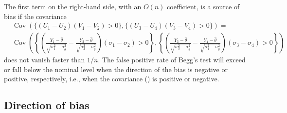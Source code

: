 \documentclass[12pt]{article}
\renewcommand{\P}{P}
\newcommand{\y}{Y}
\renewcommand{\u}{U}
\renewcommand{\v}{V}
\newcommand{\thetahat}{\hat{\theta}}
\newcommand{\h}[2]{\{(\u_{#1}-\u_{#2})(\v_{#1}-\v_{#2})>0\}}
\DeclareMathOperator{\Cov}{Cov}
\begin{document}
    The first term on the right-hand side, with an $O(n)$ coefficient, is a
    source of bias if the covariance
    \begin{align}
      &\Cov(\h{1}{2},\h{3}{4})=\\ 
      &\Cov\left(\left\{\left(\frac{\y_1-\thetahat}{\sqrt{\sigma_1^2-\sigma_{\thetahat}^2}}
        -\frac{\y_2-\thetahat}{\sqrt{\sigma_2^2-\sigma_{\thetahat}^2}}\right)(\sigma_1-\sigma_2)>0\right\} ,
       \left\{\left(\frac{\y_3-\thetahat}{\sqrt{\sigma_3^2-\sigma_{\thetahat}^2}}-\frac{\y_4-\thetahat}{\sqrt{\sigma_4^2-\sigma_{\thetahat}^2}}\right)(\sigma_3-\sigma_4)>0\right\}\right)
        \label{eqn:cov_bias_source}
    \end{align}
    does not vanish faster than $1/n$. The false positive rate of
    Begg's test will exceed or fall below the nominal level when the
    direction of the bias is negative or positive, respectively, i.e., when the covariance () is positive or negative.

    \subsection{Direction of bias}
    \label{section:theory:direction}
\end{document}
